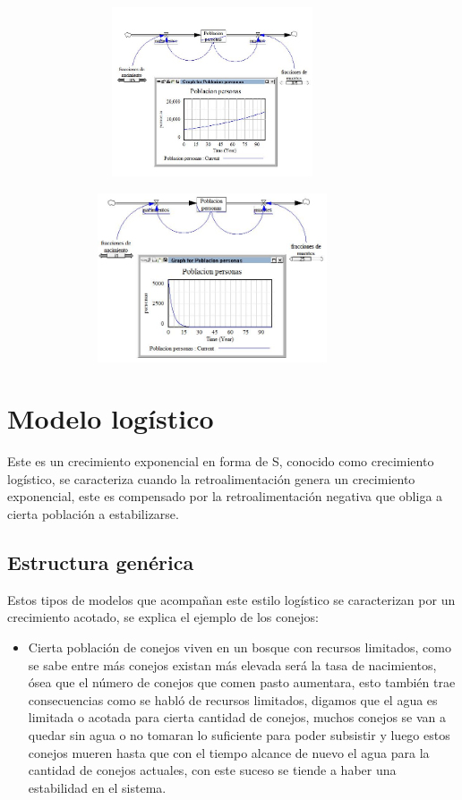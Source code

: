 \documentclass[12pt,letterpaper]{article}
\begin{document}
\begin{figure}
\centering
\includegraphics[width=10cm, height=5cm]{4.JPG}
\end{figure}
\begin{figure}
\centering
\includegraphics[width=10cm, height=5cm]{5.JPG}
\end{figure}
\section{Modelo logístico }

Este es un crecimiento exponencial en forma de S, conocido como crecimiento logístico, se caracteriza cuando la retroalimentación genera un crecimiento exponencial, este es compensado por la retroalimentación negativa que obliga a cierta población a estabilizarse.

\subsection{Estructura genérica }
 
Estos tipos de modelos que acompañan este estilo logístico se caracterizan por un crecimiento acotado, se explica el ejemplo de los conejos:
\begin{itemize}
\item Cierta población de conejos viven en un bosque con recursos limitados, como se sabe entre más conejos existan más elevada será la tasa de nacimientos, ósea que el número de conejos que comen pasto aumentara, esto también trae consecuencias como se habló de recursos limitados, digamos que el agua es limitada o acotada para cierta cantidad de conejos, muchos conejos se van a quedar sin agua o no tomaran lo suficiente para poder subsistir  y luego estos conejos mueren hasta que con el tiempo alcance de nuevo el agua para la cantidad de conejos actuales, con este suceso se tiende a haber una estabilidad en el sistema.   
\end{itemize}
\end{document}
